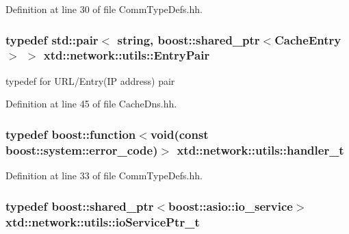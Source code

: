 Definition at line 30 of file Comm\+Type\+Defs.\+hh.

\subsubsection[{\texorpdfstring{Entry\+Pair}{EntryPair}}]{\setlength{\rightskip}{0pt plus 5cm}typedef std\+::pair$<$ string, boost\+::shared\+\_\+ptr$<${\bf Cache\+Entry}$>$ $>$ {\bf xtd\+::network\+::utils\+::\+Entry\+Pair}}\hypertarget{namespacextd_1_1network_1_1utils_a1118a93e3ee4c3aba74b90600794145b}{}\label{namespacextd_1_1network_1_1utils_a1118a93e3ee4c3aba74b90600794145b}


typedef for U\+R\+L/\+Entry(IP address) pair 



Definition at line 45 of file Cache\+Dns.\+hh.

\subsubsection[{\texorpdfstring{handler\+\_\+t}{handler_t}}]{\setlength{\rightskip}{0pt plus 5cm}typedef boost\+::function$<$void(const boost\+::system\+::error\+\_\+code)$>$ {\bf xtd\+::network\+::utils\+::handler\+\_\+t}}\hypertarget{namespacextd_1_1network_1_1utils_ac8a6f796cd645f83cde023d163665bb5}{}\label{namespacextd_1_1network_1_1utils_ac8a6f796cd645f83cde023d163665bb5}


Definition at line 33 of file Comm\+Type\+Defs.\+hh.

\subsubsection[{\texorpdfstring{io\+Service\+Ptr\+\_\+t}{ioServicePtr_t}}]{\setlength{\rightskip}{0pt plus 5cm}typedef boost\+::shared\+\_\+ptr$<$boost\+::asio\+::io\+\_\+service$>$ {\bf xtd\+::network\+::utils\+::io\+Service\+Ptr\+\_\+t}}\hypertarget{namespacextd_1_1network_1_1utils_a67dfba91438896976d636d5aea36c848}{}\label{namespacextd_1_1network_1_1utils_a67dfba91438896976d636d5aea36c848}


